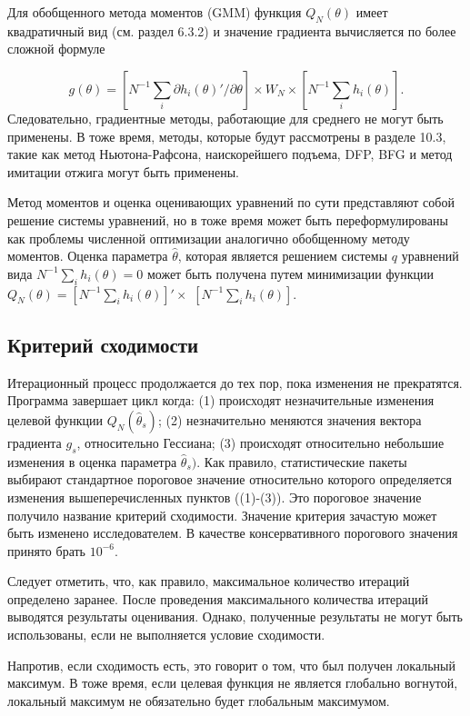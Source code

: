 Для обобщенного метода моментов (GMM) функция $Q_N({\theta})$ имеет квадратичный вид (см. раздел 6.3.2) и значение градиента вычисляется по более сложной формуле

\[
g{(\theta)}=\left[N^{-1}\sum_{i}\partial{h_i}(\theta)'/\partial{\theta}\right] \times W_N \times \left[N^{-1}\sum_{i}h_{i}(\theta)\right].
\]
Следовательно, градиентные методы, работающие для среднего не могут быть применены. В тоже время, методы, которые будут рассмотрены в разделе 10.3, такие как метод Ньютона-Рафсона, наискорейшего подъема, DFP, BFG и метод имитации отжига могут быть применены.

Метод моментов и оценка оценивающих уравнений по сути представляют собой решение системы уравнений, но в тоже время может быть переформулированы как проблемы численной оптимизации аналогично обобщенному методу моментов. Оценка параметра $\hat{\theta}$, которая является решением системы $q$ уравнений вида $N^{-1}\sum_{i}h_{i}(\theta)=0$ может быть получена путем минимизации функции $Q_N(\theta)=[N^{-1}\sum_{i}h_{i}(\theta)]'\times$ $[N^{-1}\sum_{i}h_{i}(\theta)]$.

\subsection{Критерий сходимости}

Итерационный процесс продолжается до тех пор, пока изменения не прекратятся. Программа завершает цикл когда: (1) происходят незначительные изменения целевой функции $Q_N(\hat{\theta}_s)$; (2) незначительно меняются значения вектора градиента $g_s$, относительно Гессиана; (3) происходят относительно небольшие изменения в оценка параметра $\hat{\theta}_s)$. Как правило, статистические пакеты выбирают стандартное пороговое значение относительно которого определяется изменения вышеперечисленных пунктов ((1)-(3)). Это пороговое значение получило название критерий сходимости. Значение критерия зачастую может быть изменено исследователем. В качестве консервативного порогового значения  принято брать $10^{-6}$.

Следует отметить, что, как правило, максимальное количество итераций определено заранее. После проведения максимального количества итераций выводятся результаты оценивания. Однако, полученные результаты не могут быть использованы, если не выполняется условие сходимости.

Напротив, если сходимость есть, это говорит о том, что был получен локальный максимум. В тоже время, если целевая функция не является глобально вогнутой, локальный максимум не обязательно будет глобальным максимумом.


